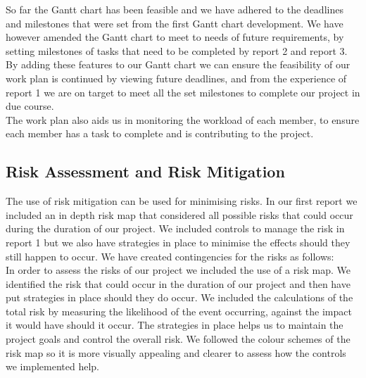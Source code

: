 So far the Gantt chart has been feasible and we have adhered to the deadlines and milestones that were set from the first Gantt chart development. We have however amended the Gantt chart to meet to needs of future requirements, by setting milestones of tasks that need to be completed by report 2 and report 3. By adding these features to our Gantt chart we can ensure the feasibility of our work plan is continued by viewing future deadlines, and from the experience of report 1 we are on target to meet all the set milestones to complete our project in due course.\\

The work plan also aids us in monitoring the workload of each member, to ensure each member has a task to complete and is contributing to the project.

\subsection*{Risk Assessment and Risk Mitigation}

The use of risk mitigation can be used for minimising risks. In our first report we included an in depth risk map that considered all possible risks that could occur during the duration of our project. We included controls to manage the risk in report 1 but we also have strategies in place to minimise the effects should they still happen to occur. We have created contingencies for the risks as follows:\\



 In order to assess the risks of our project we included the use of a risk map. We identified the risk that could occur in the duration of our project and then have put strategies in place should they do occur. We included the calculations of the total risk by measuring the likelihood of the event occurring, against the impact it would have should it occur. The strategies in place helps us to maintain the project goals and control the overall risk. We followed the colour schemes of the risk map so it is more visually appealing and clearer to assess how the controls we implemented help. \\
 


